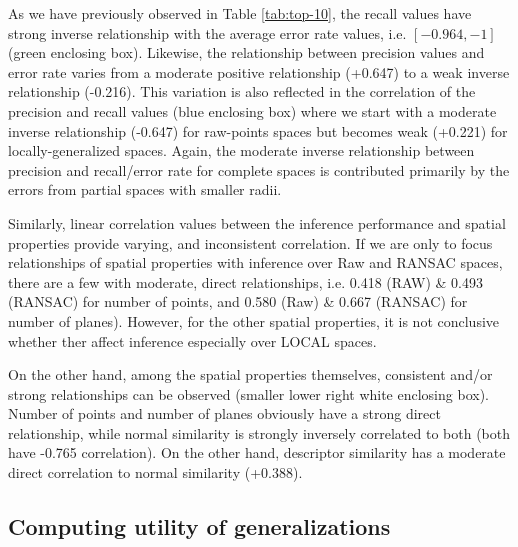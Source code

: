 As we have previously observed in Table \ref{tab:top-10}, the recall values have strong inverse relationship with the average error rate values, i.e. $\left[-0.964,-1\right]$ (green enclosing box). Likewise, the relationship between precision values and error rate varies from a moderate positive relationship (+0.647) to a weak inverse relationship (-0.216). This variation is also reflected in the correlation of the precision and recall values (blue enclosing box) where we start with a moderate inverse relationship (-0.647) for raw-points spaces but becomes weak (+0.221) for locally-generalized spaces. Again, the moderate inverse relationship between precision and recall/error rate for complete spaces is contributed primarily by the errors from partial spaces with smaller radii.

Similarly, linear correlation values between the inference performance and spatial properties provide varying, and inconsistent correlation. If we are only to focus relationships of spatial properties with inference over Raw and RANSAC spaces, there are a few with moderate, direct relationships, i.e. 0.418 (RAW) \& 0.493 (RANSAC) for number of points, and 0.580 (Raw) \& 0.667 (RANSAC) for number of planes). However, for the other spatial properties,  it is not conclusive whether ther affect inference especially over LOCAL spaces. %

On the other hand, among the spatial properties themselves, consistent and/or strong relationships can be observed (smaller lower right white enclosing box). Number of points and number of planes obviously have a strong direct relationship, while normal similarity is strongly inversely correlated to both (both have -0.765 correlation). On the other hand, descriptor similarity has a moderate direct correlation to normal similarity (+0.388).%

\subsection{Computing utility of generalizations}
\label{subsec:utility-results}


